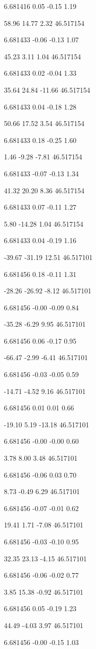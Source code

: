 6.681416
0.05
-0.15
1.19

58.96
14.77
2.32
46.517154

6.681433
-0.06
-0.13
1.07

45.23
3.11
1.04
46.517154

6.681433
0.02
-0.04
1.33

35.64
24.84
-11.66
46.517154

6.681433
0.04
-0.18
1.28

50.66
17.52
3.54
46.517154

6.681433
0.18
-0.25
1.60

1.46
-9.28
-7.81
46.517154

6.681433
-0.07
-0.13
1.34

41.32
20.20
8.36
46.517154

6.681433
0.07
-0.11
1.27

5.80
-14.28
1.04
46.517154

6.681433
0.04
-0.19
1.16

-39.67
-31.19
12.51
46.517101

6.681456
0.18
-0.11
1.31

-28.26
-26.92
-8.12
46.517101

6.681456
-0.00
-0.09
0.84

-35.28
-6.29
9.95
46.517101

6.681456
0.06
-0.17
0.95

-66.47
-2.99
-6.41
46.517101

6.681456
-0.03
-0.05
0.59

-14.71
-4.52
9.16
46.517101

6.681456
0.01
0.01
0.66

-19.10
5.19
-13.18
46.517101

6.681456
-0.00
-0.00
0.60

3.78
8.00
3.48
46.517101

6.681456
-0.06
0.03
0.70

8.73
-0.49
6.29
46.517101

6.681456
-0.07
-0.01
0.62

19.41
1.71
-7.08
46.517101

6.681456
-0.03
-0.10
0.95

32.35
23.13
-4.15
46.517101

6.681456
-0.06
-0.02
0.77

3.85
15.38
-0.92
46.517101

6.681456
0.05
-0.19
1.23

44.49
-4.03
3.97
46.517101

6.681456
-0.00
-0.15
1.03

